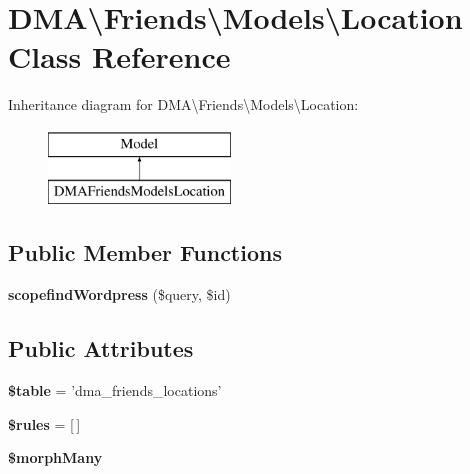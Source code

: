 \hypertarget{classDMA_1_1Friends_1_1Models_1_1Location}{\section{D\-M\-A\textbackslash{}Friends\textbackslash{}Models\textbackslash{}Location Class Reference}
\label{classDMA_1_1Friends_1_1Models_1_1Location}
}
Inheritance diagram for D\-M\-A\textbackslash{}Friends\textbackslash{}Models\textbackslash{}Location\-:\begin{figure}[H]
\begin{center}
\leavevmode
\includegraphics[height=2.000000cm]{d6/df9/classDMA_1_1Friends_1_1Models_1_1Location}
\end{center}
\end{figure}
\subsection*{Public Member Functions}
\begin{DoxyCompactItemize}
\item 
\hypertarget{classDMA_1_1Friends_1_1Models_1_1Location_ad8b1171d787276f812889f20a6916e15}{{\bfseries scopefind\-Wordpress} (\$query, \$id)}\label{classDMA_1_1Friends_1_1Models_1_1Location_ad8b1171d787276f812889f20a6916e15}

\end{DoxyCompactItemize}
\subsection*{Public Attributes}
\begin{DoxyCompactItemize}
\item 
\hypertarget{classDMA_1_1Friends_1_1Models_1_1Location_ac1f41b316e50581d95f80655e36b7f9d}{{\bfseries \$table} = 'dma\-\_\-friends\-\_\-locations'}\label{classDMA_1_1Friends_1_1Models_1_1Location_ac1f41b316e50581d95f80655e36b7f9d}

\item 
\hypertarget{classDMA_1_1Friends_1_1Models_1_1Location_a3df0019a82eb74c240408878329baa2c}{{\bfseries \$rules} = \mbox{[}$\,$\mbox{]}}\label{classDMA_1_1Friends_1_1Models_1_1Location_a3df0019a82eb74c240408878329baa2c}

\item 
{\bfseries \$morph\-Many}
\end{DoxyCompactItemize}
